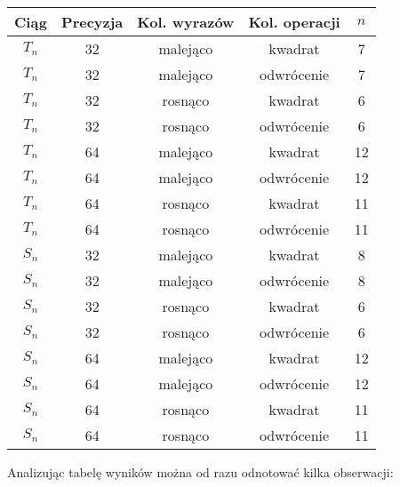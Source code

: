 \documentclass[12pt,a4paper]{article}
\begin{document}
\begin{center}
	\begin{tabular}{||c|c|c|c||c||} \hline
	Ciąg & Precyzja & Kol. wyrazów & Kol. operacji & $n$ \\ \hline
	$T_n$ 	& 32     & malejąco     & kwadrat     &  7   \\
	$T_n$ 	& 32     & malejąco     & odwrócenie  &  7   \\
	$T_n$ 	& 32     & rosnąco      & kwadrat     &  6   \\
	$T_n$ 	& 32     & rosnąco      & odwrócenie  &  6   \\ \hline
	$T_n$ 	& 64     & malejąco     & kwadrat     &  12  \\
	$T_n$ 	& 64     & malejąco     & odwrócenie  &  12  \\ 
	$T_n$ 	& 64     & rosnąco      & kwadrat     &  11  \\
	$T_n$ 	& 64     & rosnąco      & odwrócenie  &  11  \\ \hline
	$S_n$ 	& 32     & malejąco     & kwadrat     &  8   \\
	$S_n$ 	& 32     & malejąco     & odwrócenie  &  8   \\
	$S_n$ 	& 32     & rosnąco      & kwadrat     &  6   \\
	$S_n$ 	& 32     & rosnąco      & odwrócenie  &  6   \\ \hline
	$S_n$ 	& 64     & malejąco     & kwadrat     &  12  \\
	$S_n$ 	& 64     & malejąco     & odwrócenie  &  12  \\
	$S_n$ 	& 64     & rosnąco      & kwadrat     &  11  \\
	$S_n$ 	& 64     & rosnąco      & odwrócenie  &  11  \\ \hline
	\end{tabular}
\end{center}
Analizując tabelę wyników można od razu odnotować kilka obserwacji:
\end{document}
